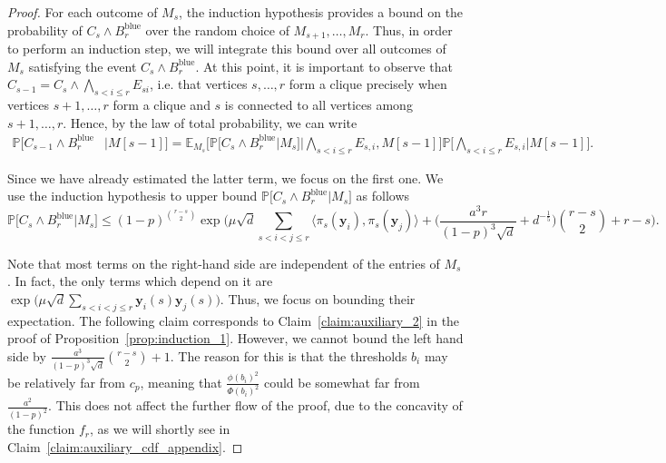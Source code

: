 \documentclass[11pt]{amsart}
\theoremstyle{definition}
\def\bE{\mathbb{E}}
\def\Pb{\mathbb{P}}
\def\by{\boldsymbol{y}}
\DeclareMathOperator{\blue}{blue}
\begin{document}
\begin{proof}
For each outcome of $M_s$, the induction hypothesis provides a bound on the probability of $C_s\wedge B^{\blue}_r$ over the random choice of $M_{s+1}, \dots, M_r$. Thus, in order to perform an induction step, we will integrate this bound over all outcomes of $M_s$ satisfying the event $C_s\wedge B^{\blue}_r$. At this point, it is important to observe that $C_{s-1}=C_{s}\wedge \bigwedge_{s<i\leq r}E_{si}$, i.e. that vertices $s, \dots, r$ form a clique precisely when vertices $s+1, \dots, r$ form a clique and $s$ is connected to all vertices among $s+1, \dots, r$. Hence, by the law of total probability, we can write
{\smaller[0.3]
\begin{align}\label{eq:total_probability_blue_appendix}
\Pb\Big[C_{s\!-\!1}\wedge B^{\blue}_r&\Big| M[s\!-\!1]\Big] =\bE_{M_s}\bigg[\Pb\Big[C_{s}\wedge B^{\blue}_r\Big| M_{s}\Big]\bigg| \bigwedge_{s<i\leq r}E_{s, i}, M[s\!-\!1]\bigg]\Pb\bigg[\bigwedge_{s<i\leq r}E_{s, i}\bigg|M[s\!-\!1]\bigg].
\end{align}
}

Since we have already estimated the latter term, we focus on the first one. We use the induction hypothesis to upper bound $\Pb\Big[C_{s}\wedge B^{\blue}_r\Big| M_{s}\Big]$ as follows
{\smaller[0.3]
\begin{equation}\label{eq:induction_hypothesis_blue_appendix}
    \Pb\Big[C_{s}\wedge B^{\blue}_r\Big| M_{s}\Big]\leq (1\!-\!p)^{\binom{r-s}{2}}\exp\bigg(\mu\sqrt{d}\!\!\sum_{s<i< j\leq r}\!\!\!\!\langle \pi_s(\by_i), \pi_s(\by_j)\rangle + \Big(\frac{a^3r}{(1-p)^3\sqrt d}+d^{-\frac{1}{5}}\Big)\binom{r\!-\!s}{2}\!+r-s\bigg).
\end{equation}
}

Note that most terms on the right-hand side are independent of the entries of $M_s$. In fact, the only terms which depend on it are $\exp\Big(\mu\sqrt{d}\sum_{s<i<j\leq r} \by_i(s)\by_j(s)\Big)$. Thus, we focus on bounding their expectation. The following claim corresponds to Claim~\ref{claim:auxiliary_2} in the proof of Proposition~\ref{prop:induction_1}. However, we cannot bound the left hand side by $\frac{a^3}{(1-p)^3\sqrt{d}}\binom{r-s}{2}+1$. The reason for this is that the thresholds $b_i$ may be relatively far from $c_p$, meaning that $\frac{\phi(b_i)^2}{\Phi(b_i)^2}$ could be somewhat far from $\frac{a^2}{(1-p)^2}$. This does not affect the further flow of the proof, due to the concavity of the function $f_r$, as we will shortly see in Claim~\ref{claim:auxiliary_cdf_appendix}.


\end{proof}
\end{document}
